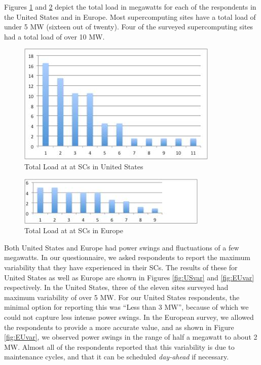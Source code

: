 \documentclass{llncs}
\begin{document}
Figures \ref{fig:USload} and \ref{fig:EUload} depict the total load in megawatts for each of the respondents in the United States and in Europe. Most supercomputing sites have a total load of under 5 MW (sixteen out of twenty). Four of the surveyed supercomputing sites had a total load of over 10 MW. 
\begin{figure}
\begin{center}
\includegraphics[scale=0.7]{figs/USLoad.jpg}
\caption{Total Load at at SCs in United States}
\label{fig:USload}
\end{center}
\end{figure}

\begin{figure}
\begin{center}
\includegraphics[scale=1]{figs/EULoad.jpg}
\caption{Total Load at at SCs in Europe}
\label{fig:EUload}
\end{center}
\end{figure}

Both United States and Europe had power swings and fluctuations of a few megawatts. In our questionnaire, we asked respondents to report the maximum variability that they have experienced in their SCs. The results of these for United States as well as Europe are shown in Figures \ref{fig:USvar} and \ref{fig:EUvar} respectively. In the United States, three of the eleven sites surveyed had maximum variability of over 5 MW. For our United States respondents, the minimal option for reporting this was ``Less than 3 MW'', because of which we could not capture less intense power swings. In the European survey, we allowed the respondents to provide a more accurate value, and as shown in Figure \ref{fig:EUvar}, we observed power swings in the range of half a megawatt to about 2 MW. Almost all of the respondents reported that this variability is due to maintenance cycles, and that it can be scheduled \emph{day-ahead} if necessary.
\end{document}
